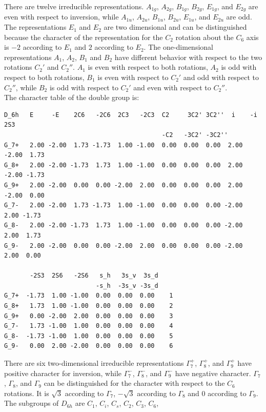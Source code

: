 \documentclass[12pt,a4paper]{article}
\begin{document}
There are twelve irreducible representations. $A_{1g}$, $A_{2g}$, $B_{1g}$, 
$B_{2g}$, $E_{1g}$, and $E_{2g}$ are even with respect to inversion, while
$A_{1u}$, $A_{2u}$, $B_{1u}$, $B_{2u}$, $E_{1u}$, and $E_{2u}$ are odd.
The representations $E_1$ and $E_2$ are two dimensional and can be
distinguished because the character of the representation for the $C_2$ 
rotation about the $C_6$ axis is $-2$ according to $E_1$ and $2$ according
to $E_2$. The one-dimensional representations $A_1$, $A_2$, $B_1$ and
$B_2$ have different behavior with respect to the two rotations $C_2'$ and
$C_2''$. $A_1$ is even with respect to both rotations, $A_2$ is odd with
respect to both rotations, $B_1$ is even with respect to $C_2'$ and odd with
respect to $C_2''$, while $B_2$ is odd with respect to $C_2'$ and even with
respect to $C_2''$. \\
The character table of the double group is:
\begin{verbatim}
D_6h   E     -E    2C6   -2C6  2C3   -2C3  C2     3C2' 3C2''  i    -i    2S3  
                                           -C2   -3C2' -3C2''                  
G_7+   2.00 -2.00  1.73 -1.73  1.00 -1.00  0.00  0.00  0.00  2.00 -2.00  1.73
G_8+   2.00 -2.00 -1.73  1.73  1.00 -1.00  0.00  0.00  0.00  2.00 -2.00 -1.73
G_9+   2.00 -2.00  0.00  0.00 -2.00  2.00  0.00  0.00  0.00  2.00 -2.00  0.00
G_7-   2.00 -2.00  1.73 -1.73  1.00 -1.00  0.00  0.00  0.00 -2.00  2.00 -1.73
G_8-   2.00 -2.00 -1.73  1.73  1.00 -1.00  0.00  0.00  0.00 -2.00  2.00  1.73
G_9-   2.00 -2.00  0.00  0.00 -2.00  2.00  0.00  0.00  0.00 -2.00  2.00  0.00

       -2S3  2S6   -2S6   s_h   3s_v  3s_d
                         -s_h  -3s_v -3s_d
G_7+  -1.73  1.00 -1.00  0.00  0.00  0.00    1
G_8+   1.73  1.00 -1.00  0.00  0.00  0.00    2
G_9+   0.00 -2.00  2.00  0.00  0.00  0.00    3 
G_7-   1.73 -1.00  1.00  0.00  0.00  0.00    4
G_8-  -1.73 -1.00  1.00  0.00  0.00  0.00    5
G_9-   0.00  2.00 -2.00  0.00  0.00  0.00    6
\end{verbatim}
There are six two-dimensional irreducible representations $\Gamma_7^+$,
$\Gamma_8^+$, and $\Gamma_9^+$ have positive character for inversion, while
$\Gamma_7^-$, $\Gamma_8^-$, and $\Gamma_9^-$ have negative character. 
$\Gamma_7$, $\Gamma_8$,
and $\Gamma_9$ can be distinguished for the character with respect to the $C_6$
rotations. It is $\sqrt{3}$ according to $\Gamma_7$, $-\sqrt{3}$ according
to $\Gamma_8$ and $0$ according to $\Gamma_9$.\\
The subgroups of $D_{6h}$ are $C_1$, $C_i$, $C_s$, $C_2$, $C_3$, $C_6$,
\end{document}
